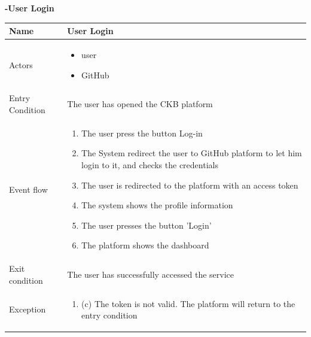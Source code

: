 \begin{enumerate}[label=\textbf{[UC\arabic*]}]
 \item \textbf{-User Login}  
    \\ \begin{tabular}{|l|p{11cm}|}
        \hline
        Name & User Login\\
        \hline
        Actors & \begin{itemize}
                    \item user
                    \item GitHub
                \end{itemize} \\
        \hline
        Entry Condition & The user has opened the CKB platform\\
        \hline
        Event flow & \begin{enumerate}
            \item The user press the button Log-in
            \item The System redirect the user to GitHub platform to let him login to it, and checks the credentials
            \item The user is redirected to the platform with an access token
            \item The system shows the profile information
            \item The user presses the button 'Login'
            \item The platform shows the dashboard
        \end{enumerate}\\

        \hline
        Exit condition & The user has successfully accessed the service \\

        \hline
        Exception & \begin{enumerate} [label={}, leftmargin=0.25cm ]
            \item (c) The token is not valid. The platform will return to the entry condition
        \end{enumerate} \\ 
        \hline                
    \end{tabular}
    \pagebreak
   


\end{enumerate}

